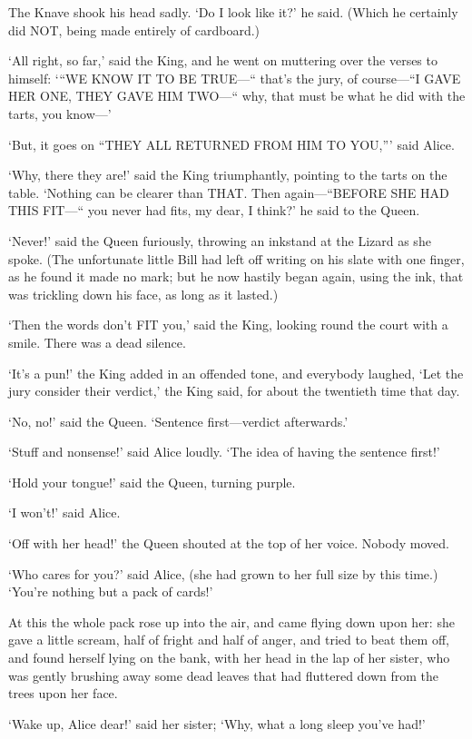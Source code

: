 \documentclass[12pt]{book}
\begin{document}
\begin{Parallel}[p]{}{}
{The Knave shook his head sadly. ‘Do I look like it?’ he said. (Which he certainly did NOT, being made entirely of cardboard.)

‘All right, so far,’ said the King, and he went on muttering over the verses to himself: ‘“WE KNOW IT TO BE TRUE—“ that’s the jury, of course—“I GAVE HER ONE, THEY GAVE HIM TWO—“ why, that must be what he did with the tarts, you know—’

‘But, it goes on “THEY ALL RETURNED FROM HIM TO YOU,”’ said Alice.

‘Why, there they are!’ said the King triumphantly, pointing to the tarts on the table. ‘Nothing can be clearer than THAT. Then again—“BEFORE SHE HAD THIS FIT—“ you never had fits, my dear, I think?’ he said to the Queen.

‘Never!’ said the Queen furiously, throwing an inkstand at the Lizard as she spoke. (The unfortunate little Bill had left off writing on his slate with one finger, as he found it made no mark; but he now hastily began again, using the ink, that was trickling down his face, as long as it lasted.)

‘Then the words don’t FIT you,’ said the King, looking round the court with a smile. There was a dead silence.

‘It’s a pun!’ the King added in an offended tone, and everybody laughed, ‘Let the jury consider their verdict,’ the King said, for about the twentieth time that day.

‘No, no!’ said the Queen. ‘Sentence first—verdict afterwards.’

‘Stuff and nonsense!’ said Alice loudly. ‘The idea of having the sentence first!’

‘Hold your tongue!’ said the Queen, turning purple.

‘I won’t!’ said Alice.

‘Off with her head!’ the Queen shouted at the top of her voice. Nobody moved.

‘Who cares for you?’ said Alice, (she had grown to her full size by this time.) ‘You’re nothing but a pack of cards!’

At this the whole pack rose up into the air, and came flying down upon her: she gave a little scream, half of fright and half of anger, and tried to beat them off, and found herself lying on the bank, with her head in the lap of her sister, who was gently brushing away some dead leaves that had fluttered down from the trees upon her face.

‘Wake up, Alice dear!’ said her sister; ‘Why, what a long sleep you’ve had!’

}
\end{Parallel}
\end{document}
